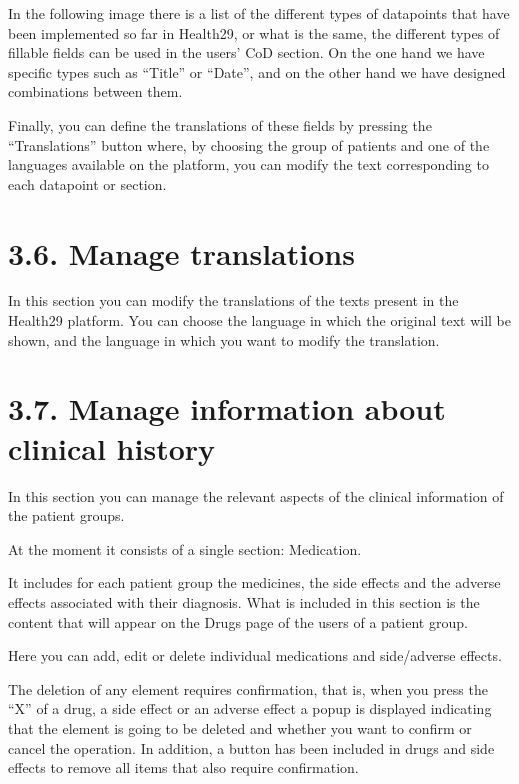 \documentclass[letterpaper,10pt,english]{sphinxmanual}
\begin{document}
In the following image there is a list of the different types of datapoints that have been implemented so far in Health29, or what is the same, the different types of fillable fields can be used in the users’ CoD section. On the one hand we have specific types such as “Title” or “Date”, and on the other hand we have designed combinations between them.



Finally, you can define the translations of these fields by pressing the “Translations” button where, by choosing the group of patients and one of the languages available on the platform, you can modify the text corresponding to each datapoint or section.




\section{3.6. Manage translations}
\label{\detokenize{pages/Superadmin profile:manage-translations}}
In this section you can modify the translations of the texts present in the Health29 platform.
You can choose the language in which the original text will be shown, and the language in which you want to modify the translation.




\section{3.7. Manage information about clinical history}
\label{\detokenize{pages/Superadmin profile:manage-information-about-clinical-history}}
In this section you can manage the relevant aspects of the clinical information of the patient groups.

At the moment it consists of a single section: Medication.



It includes for each patient group the medicines, the side effects and the adverse effects associated with their diagnosis.
What is included in this section is the content that will appear on the Drugs page of the users of a patient group.







Here you can add, edit or delete individual medications and side/adverse effects.

The deletion of any element requires confirmation, that is, when you press the “X” of a drug, a side effect or an adverse effect a popup is displayed indicating that the element is going to be deleted and whether you want to confirm or cancel the operation.
In addition, a button has been included in drugs and side effects to remove all items that also require confirmation.
\end{document}
